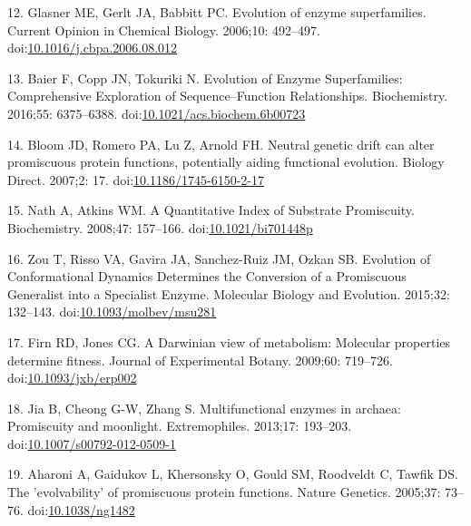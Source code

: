 \documentclass[12pt,twoside]{reedthesis}
\begin{document}
  \hypertarget{ref-glasnerux5fevolutionux5f2006}{}
  12. Glasner ME, Gerlt JA, Babbitt PC. Evolution of enzyme superfamilies.
  Current Opinion in Chemical Biology. 2006;10: 492--497.
  doi:\href{https://doi.org/10.1016/j.cbpa.2006.08.012}{10.1016/j.cbpa.2006.08.012}
  
  \hypertarget{ref-baierux5fevolutionux5f2016}{}
  13. Baier F, Copp JN, Tokuriki N. Evolution of Enzyme Superfamilies:
  Comprehensive Exploration of Sequence--Function Relationships.
  Biochemistry. 2016;55: 6375--6388.
  doi:\href{https://doi.org/10.1021/acs.biochem.6b00723}{10.1021/acs.biochem.6b00723}
  
  \hypertarget{ref-bloomux5fneutralux5f2007}{}
  14. Bloom JD, Romero PA, Lu Z, Arnold FH. Neutral genetic drift can
  alter promiscuous protein functions, potentially aiding functional
  evolution. Biology Direct. 2007;2: 17.
  doi:\href{https://doi.org/10.1186/1745-6150-2-17}{10.1186/1745-6150-2-17}
  
  \hypertarget{ref-nathux5fquantitativeux5f2008}{}
  15. Nath A, Atkins WM. A Quantitative Index of Substrate Promiscuity.
  Biochemistry. 2008;47: 157--166.
  doi:\href{https://doi.org/10.1021/bi701448p}{10.1021/bi701448p}
  
  \hypertarget{ref-zouux5fevolutionux5f2015}{}
  16. Zou T, Risso VA, Gavira JA, Sanchez-Ruiz JM, Ozkan SB. Evolution of
  Conformational Dynamics Determines the Conversion of a Promiscuous
  Generalist into a Specialist Enzyme. Molecular Biology and Evolution.
  2015;32: 132--143.
  doi:\href{https://doi.org/10.1093/molbev/msu281}{10.1093/molbev/msu281}
  
  \hypertarget{ref-firnux5fdarwinianux5f2009}{}
  17. Firn RD, Jones CG. A Darwinian view of metabolism: Molecular
  properties determine fitness. Journal of Experimental Botany. 2009;60:
  719--726.
  doi:\href{https://doi.org/10.1093/jxb/erp002}{10.1093/jxb/erp002}
  
  \hypertarget{ref-jiaux5fmultifunctionalux5f2013}{}
  18. Jia B, Cheong G-W, Zhang S. Multifunctional enzymes in archaea:
  Promiscuity and moonlight. Extremophiles. 2013;17: 193--203.
  doi:\href{https://doi.org/10.1007/s00792-012-0509-1}{10.1007/s00792-012-0509-1}
  
  \hypertarget{ref-aharoniux5fevolvabilityux5f2005}{}
  19. Aharoni A, Gaidukov L, Khersonsky O, Gould SM, Roodveldt C, Tawfik
  DS. The 'evolvability' of promiscuous protein functions. Nature
  Genetics. 2005;37: 73--76.
  doi:\href{https://doi.org/10.1038/ng1482}{10.1038/ng1482}
  
\end{document}
